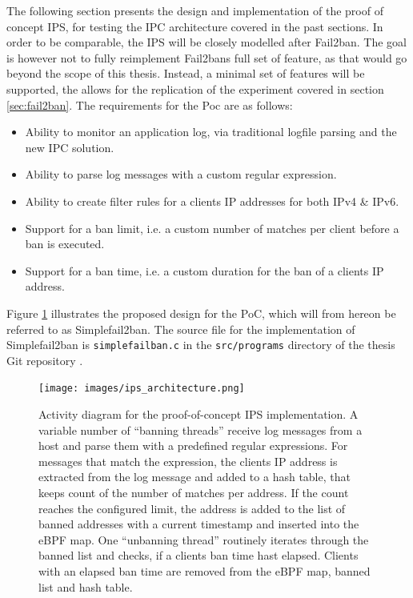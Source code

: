 The following section presents the design and implementation of the proof of concept \ac{IPS}, for testing the \ac{IPC} architecture covered in the past sections.
In order to be comparable, the \ac{IPS} will be closely modelled after Fail2ban. The goal is however not to fully reimplement Fail2bans full set of feature, as that would go beyond
the scope of this thesis. Instead, a minimal set of features will be supported, the allows for the replication of the experiment covered in section \ref{sec:fail2ban}. 
The requirements for the \ac{Poc} are as follows:
\begin{itemize}
    \item Ability to monitor an application log, via traditional logfile parsing and the new \ac{IPC} solution.
    \item Ability to parse log messages with a custom regular expression.
    \item Ability to create filter rules for a clients IP addresses for both \ac{IPv4} \& \ac{IPv6}.
    \item Support for a ban limit, i.e. a custom number of matches per client before a ban is executed.
    \item Support for a ban time, i.e. a custom duration for the ban of a clients IP address. 
\end{itemize} 

Figure \ref{fig:ips_architecture} illustrates the proposed design for the \ac{PoC}, which will from hereon be referred to as Simplefail2ban. The source file 
for the implementation of Simplefail2ban is \texttt{simplefailban.c} in the \texttt{src/programs} directory of the thesis Git repository \cite{gitlab}.


\begin{figure}[p]
    \texttt{[image: images/ips\_architecture.png]}
    \caption[Simplefail2ban Architecture]{Activity diagram for the proof-of-concept IPS implementation. A variable number of ``banning threads'' receive log messages from a host and
    parse them with a predefined regular expressions. For messages that match the expression, the clients IP address is extracted from the log message and added to a hash table, that keeps count of
    the number of matches per address. If the count reaches the configured limit, the address is added to the list of banned addresses with a current timestamp and inserted into the eBPF map. One ``unbanning
   thread'' routinely iterates through the banned list and checks, if a clients ban time hast elapsed. Clients with an elapsed ban time are removed from the eBPF map, banned list and hash table.}
   \label{fig:ips_architecture}
\end{figure}

